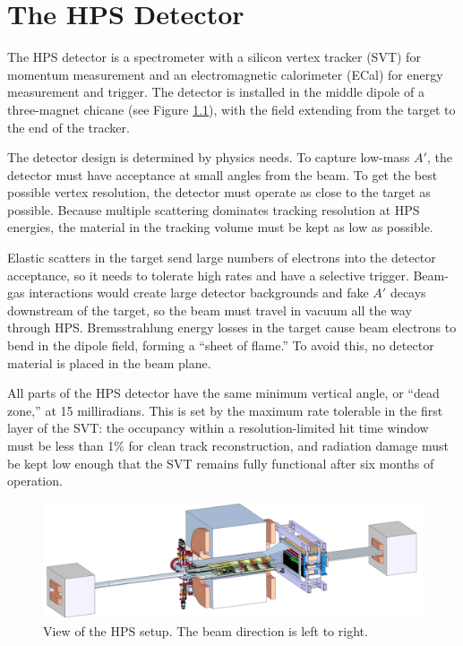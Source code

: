 \chapter{The HPS Detector}

The HPS detector is a spectrometer with a silicon vertex tracker (SVT) for momentum measurement and an electromagnetic calorimeter (ECal) for energy measurement and trigger.
The detector is installed in the middle dipole of a three-magnet chicane (see Figure \ref{fig:hps-pic}), with the field extending from the target to the end of the tracker.

The detector design is determined by physics needs.
To capture low-mass $A'$, the detector must have acceptance at small angles from the beam.
To get the best possible vertex resolution, the detector must operate as close to the target as possible.
Because multiple scattering dominates tracking resolution at HPS energies, the material in the tracking volume must be kept as low as possible.

Elastic scatters in the target send large numbers of electrons into the detector acceptance, so it needs to tolerate high rates and have a selective trigger.
Beam-gas interactions would create large detector backgrounds and fake $A'$ decays downstream of the target, so the beam must travel in vacuum all the way through HPS.
Bremsstrahlung energy losses in the target cause beam electrons to bend in the dipole field, forming a ``sheet of flame.'' To avoid this, no detector material is placed in the beam plane.

All parts of the HPS detector have the same minimum vertical angle, or ``dead zone,'' at 15 milliradians.
This is set by the maximum rate tolerable in the first layer of the SVT: the occupancy within a resolution-limited hit time window must be less than 1\% for clean track reconstruction, and radiation damage must be kept low enough that the SVT remains fully functional after six months of operation.

\begin{figure}[htp]
    \includegraphics[width=\textwidth]{detector/figs/HPS-pic}
    \caption{View of the HPS setup.
    The beam direction is left to right.}
    \label{fig:hps-pic}
\end{figure}

